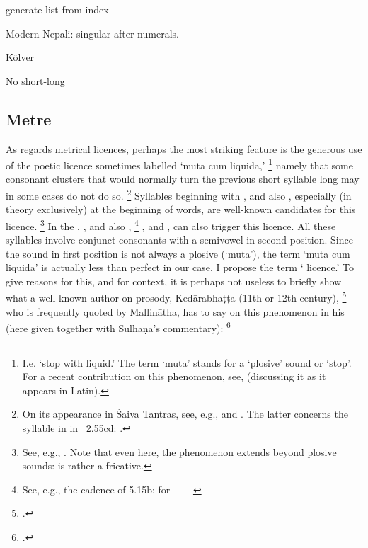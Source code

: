   generate list from index

Modern Nepali: singular after numerals.

Kölver

No short-long


\subsection{Metre}\label{metre}
\label{muta}
As regards metrical licences, perhaps 
the most striking feature is the generous
use of the poetic licence sometimes labelled `muta cum liquida,'%
	\footnote{I.e. `stop with liquid.' The term `muta' stands for a `plosive' sound or `stop'. 
	 For a recent contribution on this phenomenon, see,
 	  (discussing it as it appears in Latin).}
namely that some consonant clusters that would 
normally turn the previous short  syllable
long  may in some cases do not do so.%
		\footnote{On its appearance in Śaiva Tantras,
							see, e.g.,  and
							. The latter concerns
							 the syllable  in  in \Nisvnaya\ 2.55cd:
							. }
Syllables beginning with , and also ,
especially (in theory exclusively) at the beginning of words, are well-known
candidates for this licence.%
			\footnote{See, e.g., .
			Note that even here, the phenomenon extends beyond plosive sounds:
				 is rather a fricative.} 
In the \VSS, , and also ,%
	\footnote{See, e.g., the cadence of 5.15b:  for \ \shortsyllable\
								\shortsyllable - \shortsyllable -}
, and , can also trigger this licence.
All these syllables involve conjunct consonants with
a semivowel in second position. Since the sound in 
first position is not always a plosive (`muta'), the term
`muta cum liquida' is actually less than perfect in our case.
I propose the term ` licence.' To give reasons for this,
and for context, it is perhaps not useless to briefly show
what a well-known author on prosody, 
Kedārabhaṭṭa (11th or 12th century),%
		\footnote{.}
who is frequently quoted by Mallinātha, has to say on this
phenomenon in his
 (here given together with Sulhaṇa's  commentary):%
		\footnote{\mycite{PatelVrttaratnakara}.}

